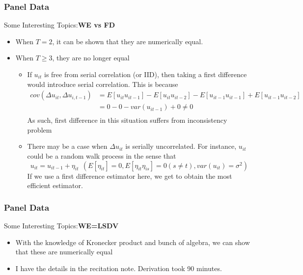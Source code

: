 \documentclass{beamer}
\begin{document}
\begin{frame}
\frametitle{Panel Data}
Some Interesting Topics:\textbf{WE vs FD}
\begin{itemize}
\item When $T=2$, it can be shown that they are numerically equal. 
\item When $T\geq3$, they are no longer equal
\begin{itemize}
\item If $u_{it}$ is free from serial correlation (or IID), then taking a first difference would introduce serial correlation. This is because
\footnotesize{\[
\begin{aligned}
cov(\Delta u_{it},\Delta u_{i,t-1})&=E[u_{it}u_{it-1}]-E[u_{it}u_{it-2}]-E[u_{it-1}u_{it-1}]+E[u_{it-1}u_{it-2}]\\
&=0-0-var(u_{it-1})+0\neq 0 \\
\end{aligned}
\]}\normalsize
As such, first difference in this situation suffers from inconsistency problem
\item There may be a case when $\Delta u_{it}$ is serially uncorrelated. For instance, $u_{it}$ could be a random walk process in the sense that
\[
u_{it}=u_{it-1}+\eta_{it} \ \ (E[\eta_{it}]=0, E[\eta_{it}\eta_{is}]=0 (s\neq t), var(u_{it})=\sigma^2)
\]
If we use a first difference estimator here, we get to obtain the most efficient estimator. 
\end{itemize}
\end{itemize}
\end{frame}


\begin{frame}
\frametitle{Panel Data}
Some Interesting Topics:\textbf{WE=LSDV}
\begin{itemize}
\item With the knowledge of Kronecker product and bunch of algebra, we can show that these are numerically equal
\item I have the details in the recitation note. Derivation took 90 minutes.  
\end{itemize}
\end{frame}
\end{document}
